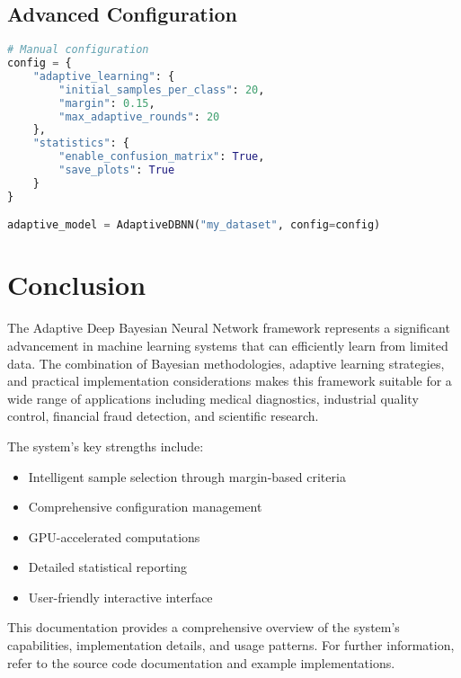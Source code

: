 \documentclass[11pt]{article}
\begin{document}
\subsection{Advanced Configuration}

\begin{lstlisting}[language=Python]
# Manual configuration
config = {
    "adaptive_learning": {
        "initial_samples_per_class": 20,
        "margin": 0.15,
        "max_adaptive_rounds": 20
    },
    "statistics": {
        "enable_confusion_matrix": True,
        "save_plots": True
    }
}

adaptive_model = AdaptiveDBNN("my_dataset", config=config)
\end{lstlisting}

\section{Conclusion}

The Adaptive Deep Bayesian Neural Network framework represents a significant advancement in machine learning systems that can efficiently learn from limited data. The combination of Bayesian methodologies, adaptive learning strategies, and practical implementation considerations makes this framework suitable for a wide range of applications including medical diagnostics, industrial quality control, financial fraud detection, and scientific research.

The system's key strengths include:
\begin{itemize}
\item Intelligent sample selection through margin-based criteria
\item Comprehensive configuration management
\item GPU-accelerated computations
\item Detailed statistical reporting
\item User-friendly interactive interface
\end{itemize}

This documentation provides a comprehensive overview of the system's capabilities, implementation details, and usage patterns. For further information, refer to the source code documentation and example implementations.
\end{document}
